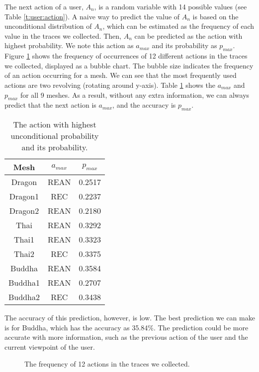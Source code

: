 The next action of a user, $A_n$, is a random variable with 14 possible values
(see Table \ref{t:user:action}). 
A naive way to predict the value of $A_n$ is based on the unconditional distribution 
of $A_n$, which can be estimated as the frequency of each value in the traces
we collected.  
Then, $A_n$ can be predicted as the action with highest probability.
We note this action as $a_{max}$ and its probability as $p_{max}$.
Figure \ref{f:user:frequency}
shows the frequency of occurrences of 12 different actions in the traces we collected,
displayed as a bubble chart. 
The bubble size indicates the frequency of an action occurring for a mesh.
We can see that the most frequently used actions are two revolving (rotating around y-axis). 
Table \ref{t:user:highest_probability} shows the $a_{max}$ and $p_{max}$ for all 9 meshes.
As a result, without any extra information, we can always predict that the next action is 
$a_{max}$, and the accuracy is $p_{max}$.
\begin{table}
    \centering
    \begin{tabular}{|c|c|c|}
        \hline
        Mesh              &     $a_{max}$         &    $p_{max}$ \\
        \hline
        Dragon            &     REAN              &    0.2517    \\
        Dragon1           &     REC               &    0.2237    \\
        Dragon2           &     REAN              &    0.2180    \\
        Thai              &     REAN              &    0.3292    \\
        Thai1             &     REAN              &    0.3323    \\
        Thai2             &     REC               &    0.3375    \\
        Buddha            &     REAN              &    0.3584    \\
        Buddha1           &     REAN              &    0.2707    \\
        Buddha2           &     REC               &    0.3438    \\
        \hline
    \end{tabular}
    \caption{The action with highest unconditional probability and its probability.}
    \label{t:user:highest_probability}
\end{table}
The accuracy of this prediction, however, is low. 
The best prediction we can make is for Buddha, which has the accuracy as 35.84\%. %
The prediction could be more accurate with more information,
such as the previous action of the user and the current viewpoint of the user.
\begin{figure}[htdp!]
    \centering
    \caption{The frequency of 12 actions in the traces we collected.}
    \label{f:user:frequency}
\end{figure}

